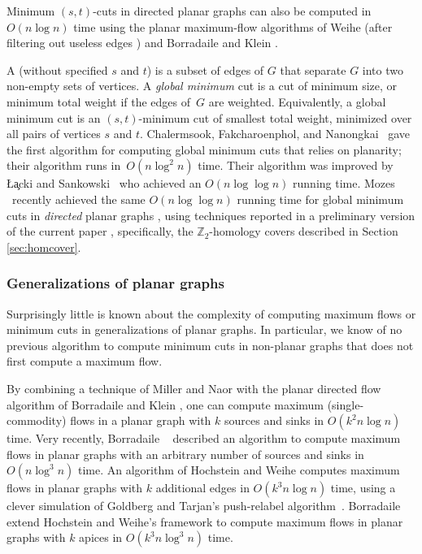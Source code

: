 \documentclass[letterpaper,review]{siamart190516}
\def\Z{\mathbb{Z}}
\begin{document}
Minimum $(s,t)$-cuts in directed planar graphs can also be computed in $O(n\log n)$ time using the planar maximum-flow algorithms of Weihe \cite{w-mstfp-97} (after filtering out useless edges \cite{fls-fuadp-18}) and Borradaile and Klein \cite{b-epnfc-08, bk-tamfd-06, bk-amfdp-09}.

A  (without specified $s$ and $t$) is a subset of edges of $G$ that separate $G$ into two non-empty sets of vertices.
A \emph{global minimum} cut is a cut of minimum size, or minimum total weight if the edges of~$G$
are weighted.  Equivalently, a global minimum cut is an $(s,t)$-minimum cut of smallest total
weight, minimized over all pairs of vertices $s$ and $t$.  Chalermsook, Fakcharoenphol, and
Nanongkai~\cite{cfn-dnlta-04} gave the first algorithm for computing global minimum cuts that relies
on planarity; their algorithm runs in~$O(n \log^2 n)$ time.  Their algorithm was improved by
\L\c{a}cki and Sankowski~\cite{ls-mcsc-11} who achieved an $O(n \log \log n)$ running time.  Mozes
\etal~recently achieved the same $O(n \log \log n)$ running time for global minimum cuts in
\emph{directed} planar graphs \cite{mnnw-mdpgo-18},  using techniques reported in a preliminary
version of the current paper \cite{en-mcsnc-11}, specifically, the $\Z_2$-homology covers described in Section \ref{sec:homcover}.

\subsubsection*{Generalizations of planar graphs}

Surprisingly little is known about the complexity of computing maximum flows or minimum cuts in generalizations of planar graphs.  In particular, we know of no previous algorithm to compute minimum cuts in non-planar graphs that does not first compute a maximum flow.

By combining a technique of Miller and Naor \cite{mn-fpgms-95} with the planar directed flow
algorithm of Borradaile and Klein \cite{b-epnfc-08, bk-tamfd-06, bk-amfdp-09, e-mfpsp-10}, one can
compute maximum (single-commodity) flows in a planar graph with $k$ sources and sinks in $O(k^2
n\log n)$ time.  Very recently, Borradaile \etal~\cite{bkmnw-msmsm-17} described an algorithm to
compute maximum flows in planar graphs with an arbitrary number of sources and sinks in $O(n\log^3 n)$ time.  An algorithm of Hochstein and Weihe \cite{hw-mstfkc-07} computes maximum flows in planar graphs with $k$ additional edges in $O(k^3n\log n)$ time, using a clever simulation of Goldberg and Tarjan's push-relabel algorithm~\cite{gt-namfp-88}.  Borradaile \etal~\cite{bkmnw-msmsm-17} extend Hochstein and Weihe's framework to compute maximum flows in planar graphs with $k$ apices in $O(k^3n\log^3 n)$ time.
\end{document}
